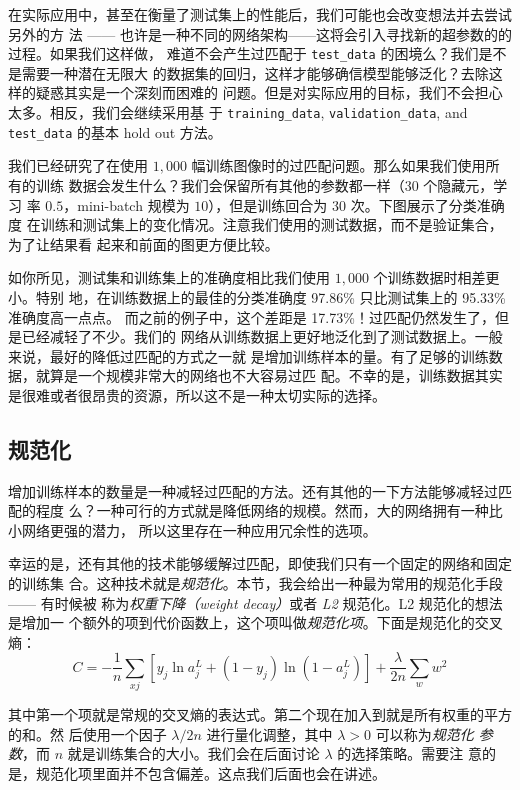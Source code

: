 在实际应用中，甚至在衡量了测试集上的性能后，我们可能也会改变想法并去尝试另外的方
法 —— 也许是一种不同的网络架构——这将会引入寻找新的超参数的的过程。如果我们这样做，
难道不会产生过匹配于 \lstinline!test_data! 的困境么？我们是不是需要一种潜在无限大
的数据集的回归，这样才能够确信模型能够泛化？去除这样的疑惑其实是一个深刻而困难的
问题。但是对实际应用的目标，我们不会担心太多。相反，我们会继续采用基
于 \lstinline!training_data!, \lstinline!validation_data!, and
\lstinline!test_data! 的基本 hold out 方法。

我们已经研究了在使用 $1,000$ 幅训练图像时的过匹配问题。那么如果我们使用所有的训练
数据会发生什么？我们会保留所有其他的参数都一样（$30$ 个隐藏元，学习
率 $0.5$，mini-batch 规模为 $10$），但是训练回合为 $30$ 次。下图展示了分类准确度
在训练和测试集上的变化情况。注意我们使用的测试数据，而不是验证集合，为了让结果看
起来和前面的图更方便比较。

如你所见，测试集和训练集上的准确度相比我们使用 $1,000$ 个训练数据时相差更小。特别
地，在训练数据上的最佳的分类准确度 97.86\% 只比测试集上的 95.33\% 准确度高一点点。
而之前的例子中，这个差距是 17.73\%！过匹配仍然发生了，但是已经减轻了不少。我们的
网络从训练数据上更好地泛化到了测试数据上。一般来说，最好的降低过匹配的方式之一就
是增加训练样本的量。有了足够的训练数据，就算是一个规模非常大的网络也不大容易过匹
配。不幸的是，训练数据其实是很难或者很昂贵的资源，所以这不是一种太切实际的选择。

\subsection{规范化}

增加训练样本的数量是一种减轻过匹配的方法。还有其他的一下方法能够减轻过匹配的程度
么？一种可行的方式就是降低网络的规模。然而，大的网络拥有一种比小网络更强的潜力，
所以这里存在一种应用冗余性的选项。

幸运的是，还有其他的技术能够缓解过匹配，即使我们只有一个固定的网络和固定的训练集
合。这种技术就是\emph{规范化}。本节，我会给出一种最为常用的规范化手段 —— 有时候被
称为\emph{权重下降（weight decay）}或者 \emph{L2} 规范化。L2 规范化的想法是增加一
个额外的项到代价函数上，这个项叫做\emph{规范化项}。下面是规范化的交叉熵：
\begin{equation}
  C = -\frac{1}{n} \sum_{xj} \left[ y_j \ln a^L_j+(1-y_j) \ln
  (1-a^L_j)\right] + \frac{\lambda}{2n} \sum_w w^2
\label{eq:85}\tag{85}
\end{equation}

其中第一个项就是常规的交叉熵的表达式。第二个现在加入到就是所有权重的平方的和。然
后使用一个因子 $\lambda/2n$ 进行量化调整，其中 $\lambda > 0$ 可以称为\emph{规范化
  参数}，而 $n$ 就是训练集合的大小。我们会在后面讨论 $\lambda$ 的选择策略。需要注
意的是，规范化项里面并不包含偏差。这点我们后面也会在讲述。

